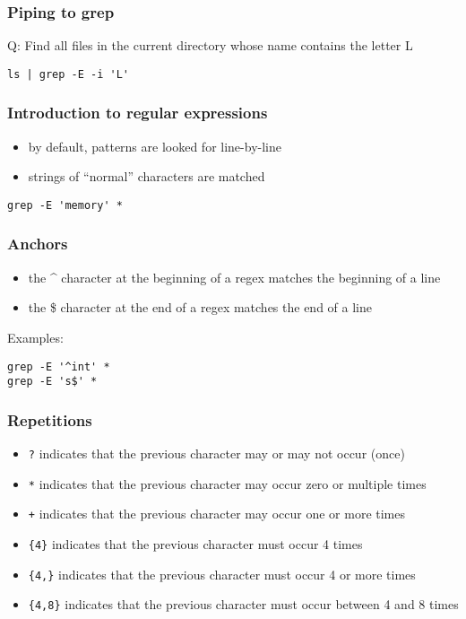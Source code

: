 \documentclass[12pt]{article}
\begin{document}
\subsubsection{Piping to grep}

Q: Find all files in the current directory whose name contains the letter L

\begin{verbatim}
ls | grep -E -i 'L'
\end{verbatim}

\subsubsection{Introduction to regular expressions}

\begin{itemize}
  \item by default, patterns are looked for line-by-line
  \item strings of “normal” characters are matched
\end{itemize}

\begin{verbatim}
grep -E 'memory' *
\end{verbatim}

\subsubsection{Anchors}

\begin{itemize}
  \item the \^{} character at the beginning of a regex matches the beginning of a line
  \item the \$ character at the end of a regex matches the end of a line
\end{itemize}

Examples:

\begin{verbatim}
grep -E '^int' *
grep -E 's$' *
\end{verbatim}

\subsubsection{Repetitions}

\begin{itemize}
    \item \texttt{?} indicates that the previous character may or may not occur (once)
    \item \texttt{*} indicates that the previous character may occur zero or multiple times
    \item \texttt{+} indicates that the previous character may occur one or more times
    \item \texttt{\{4\}} indicates that the previous character must occur 4 times
    \item \texttt{\{4,\}} indicates that the previous character must occur 4 or more times
    \item \texttt{\{4,8\}} indicates that the previous character must occur between 4 and 8 times
\end{itemize}
\end{document}
